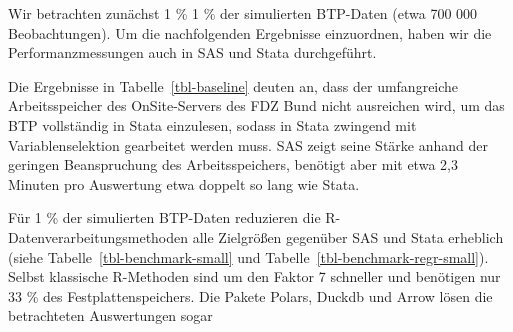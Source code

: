 \documentclass[
  german,
  10pt,
  twoside]{article}
\let\oldref\ref
\renewcommand{\ref}[1]{\oldref{#1}\raisebox{-0.2ex}{\scriptsize\color{wistaBlue}\ding{247}}}
\begin{document}
Wir betrachten zunächst 1 \% 1 \% der simulierten BTP-Daten (etwa 700
000 Beobachtungen). Um die nachfolgenden Ergebnisse einzuordnen, haben
wir die Performanzmessungen auch in SAS und Stata durchgeführt.

\begin{table}

\caption{\label{tbl-baseline}Baselines in SAS und Stata (anhand 1\% des simuliertes BTP)}


\end{table}%

Die Ergebnisse in Tabelle~\ref{tbl-baseline} deuten an, dass der
umfangreiche Arbeitsspeicher des OnSite-Servers des FDZ Bund nicht
ausreichen wird, um das BTP vollständig in Stata einzulesen, sodass in
Stata zwingend mit Variablenselektion gearbeitet werden muss. SAS zeigt
seine Stärke anhand der geringen Beanspruchung des Arbeitsspeichers,
benötigt aber mit etwa 2,3 Minuten pro Auswertung etwa doppelt so lang
wie Stata.

Für 1 \% der simulierten BTP-Daten reduzieren die
R-Datenverarbeitungsmethoden alle Zielgrößen gegenüber SAS und Stata
erheblich (siehe Tabelle~\ref{tbl-benchmark-small} und
Tabelle~\ref{tbl-benchmark-regr-small}). Selbst klassische R-Methoden
sind um den Faktor 7 schneller und benötigen nur 33 \% des
Festplattenspeichers. Die Pakete Polars, Duckdb und Arrow lösen die
betrachteten Auswertungen sogar
\end{document}
